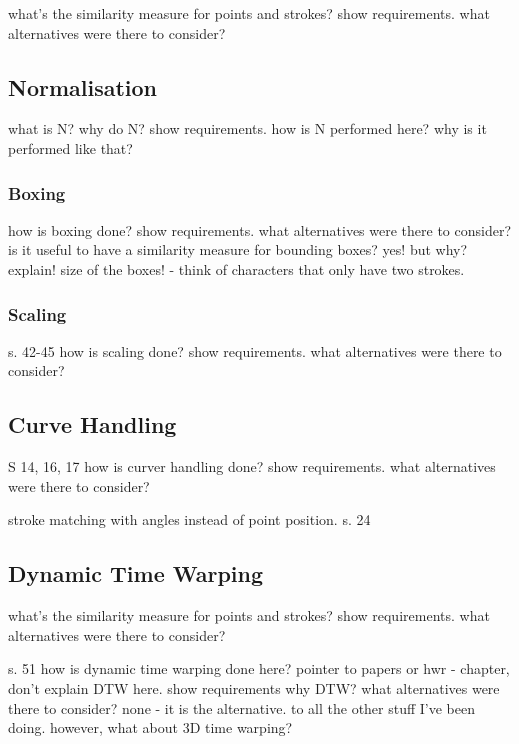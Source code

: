 what's the similarity measure for
points and strokes?
show requirements.
what alternatives were there to consider?

\subsection{Normalisation}
\label{sec:hwre:normalisation}

what is N?
why do N?
show requirements.
how is N performed here?
why is it performed like that?

\subsubsection{Boxing}
\label{sec:hwre:boxing}
how is boxing done?
show requirements.
what alternatives were there to consider?
is it useful to have a similarity measure for bounding boxes?
yes! but why? explain!
size of the boxes! - think of characters that only have two strokes.

\subsubsection{Scaling}
\label{sec:hwre:scaling}

s. 42-45
how is scaling done?
show requirements.
what alternatives were there to consider?

\subsection{Curve Handling}
\label{sec:hwre:curvehandling}

S 14, 16, 17
how is curver handling done?
show requirements.
what alternatives were there to consider?

stroke matching with angles instead of point position.
s. 24

\subsection{Dynamic Time Warping}
\label{sec:hwre:dynamictimewarping}

what's the similarity measure for
points and strokes?
show requirements.
what alternatives were there to consider?

s. 51
how is dynamic time warping done here?
pointer to papers or hwr - chapter, don't explain DTW here.
show requirements
why DTW?
what alternatives were there to consider?
none - it is the alternative.
to all the other stuff I've been doing.
however, what about 3D time warping?


